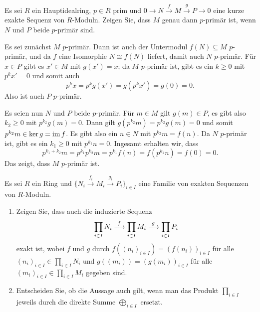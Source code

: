 \begin{question}[subtitle = $p$-primär in kurzen exakten Sequenzen]
  Es sei $R$ ein Hauptidealring, $p \in R$ prim und $0 \to N \xrightarrow{f} M \xrightarrow{g} P \to 0$ eine kurze exakte Sequenz von $R$-Moduln.
  Zeigen Sie, dass $M$ genau dann $p$-primär ist, wenn $N$ und $P$ beide $p$-primär sind.
\end{question}


\begin{solution}
  Es sei zunächst $M$ $p$-primär.
  Dann ist auch der Untermodul $f(N) \subseteq M$ $p$-primär, und da $f$ eine Isomorphie $N \cong f(N)$ liefert, damit auch $N$ $p$-primär.
  Für $x \in P$ gibt es $x' \in M$ mit $g(x') = x$; da $M$ $p$-primär ist, gibt es ein $k \geq 0$ mit $p^k x' = 0$ und somit auch
  \[
    p^k x = p^k g(x') = g(p^k x') = g(0) = 0.
  \]
  Also ist auch $P$ $p$-primär.
  
  Es seien nun $N$ und $P$ beide $p$-primär.
  Für $m \in M$ gilt $g(m) \in P$, es gibt also $k_2 \geq 0$ mit $p^{k_2} g(m) = 0$.
  Dann gilt $g(p^{k_2} m) = p^{k_2} g(m) = 0$ und somit $p^{k_2} m \in \ker g = \operatorname{im} f$.
  Es gibt also ein $n \in N$ mit $p^{k_2} m = f(n)$.
  Da $N$ $p$-primär ist, gibt es ein $k_1 \geq 0$ mit $p^{k_1} n = 0$.
  Ingesamt erhalten wir, dass
  \[
      p^{k_1 + k_2} m
    = p^{k_1} p^{k_2} m
    = p^{k_1} f(n)
    = f(p^{k_1} n)
    = f(0)
    = 0.
  \]
  Das zeigt, dass $M$ $p$-primär ist.
\end{solution}


\begin{question}[subtitle = Produkte und Summen exakter Sequenzen]
  Es sei $R$ ein Ring und $\{ N_i \xrightarrow{f_i} M_i \xrightarrow{g_i} P_i \}_{i \in I}$ eine Familie von exakten Sequenzen von $R$-Moduln.
  \begin{enumerate}
    \item
      Zeigen Sie, dass auch die induzierte Sequenz
      \[
                            \prod_{i \in I} N_i
        \xlongrightarrow{f} \prod_{i \in I} M_i
        \xlongrightarrow{g} \prod_{i \in I} P_i
      \]
      exakt ist, wobei $f$ und $g$ durch $f((n_i)_{i \in I}) = (f(n_i))_{i \in I}$ für alle $(n_i)_{i \in I} \in \prod_{i \in I} N_i$ und $g((m_i)) = (g(m_i))_{i \in I}$ für alle $(m_i)_{i \in I} \in \prod_{i \in I} M_i$ gegeben sind.
    \item
      Entscheiden Sie, ob die Aussage auch gilt, wenn man das Produkt $\prod_{i \in I}$ jeweils durch die direkte Summe $\bigoplus_{i \in I}$ ersetzt.
  \end{enumerate}
\end{question}


